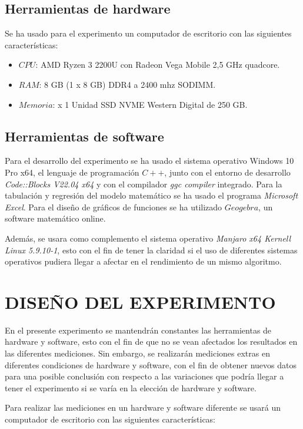 \documentclass[11pt, twocolumn]{llncs}
\begin{document}
\subsection{Herramientas de hardware}
Se ha usado para el experimento un computador de escritorio con las siguientes características:

\begin{itemize}
    \item $CPU$: AMD Ryzen 3 2200U con Radeon Vega Mobile 2,5 GHz quadcore.
    \item $RAM$: 8 GB (1 x 8 GB) DDR4 a 2400 mhz SODIMM.
    \item $Memoria$: x 1 Unidad SSD NVME Western Digital de 250 GB.
\end{itemize}

\subsection{Herramientas de software}
Para el desarrollo del experimento se ha usado el sistema operativo Windows 10 Pro x64, el lenguaje de programación $C++$, junto con el entorno de desarrollo \textit{Code::Blocks V22.04 x64} y con el compilador \textit{ggc compiler} integrado. Para la tabulación y regresión del modelo matemático se ha usado el programa \textit{Microsoft Excel}. Para el diseño de gráficos de funciones se ha utilizado $Geogebra$, un software matemático online.

Además, se usara como complemento el sistema operativo \textit{Manjaro x64 Kernell Linux 5.9.10-1}, esto con el fin de tener la claridad si el uso de diferentes sistemas operativos pudiera llegar a afectar en el rendimiento de un mismo algoritmo.

\section{DISEÑO DEL EXPERIMENTO}\label{diseño}
En el presente experimento se mantendrán constantes las herramientas de hardware y software, esto con el fin de que no se vean afectados los resultados en las diferentes mediciones. Sin embargo, se realizarán mediciones extras en diferentes condiciones de hardware y software, con el fin de obtener nuevos datos para una posible conclusión con respecto a las variaciones que podría llegar a tener el experimento si se varía en la elección de hardware y software.

Para realizar las mediciones en un hardware y software diferente se usará un computador de escritorio con las siguientes características:
\end{document}
